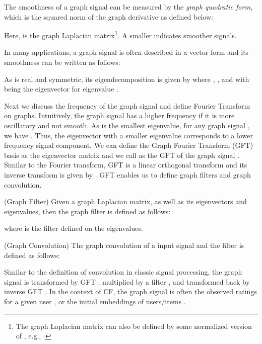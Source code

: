 \documentclass[sigconf]{acmart}
\begin{document}
The smoothness of a graph signal can be measured by the \emph{graph quadratic form}, which is the squared norm of the graph derivative as defined below:

Here,  is the graph Laplacian matrix\footnote{The graph Laplacian matrix can also be defined by some normalized version of , e.g., .}. A smaller  indicates smoother signals. 

In many applications, a graph signal is often described in a vector form  and its smoothness can be written as follows:


As  is real and symmetric, its eigendecomposition is given by  where , , and  with  being the eigenvector for eigenvalue .

Next we discuss the frequency of the graph signal and define Fourier Transform on graphs. Intuitively, the graph signal has a  higher frequency if it is more 
oscillatory and not smooth. As  is the smallest eigenvalue, for any graph signal , we have . Thus, the eigenvector with a smaller eigenvalue corresponds to a lower frequency signal component. We can define the Graph Fourier Transform (GFT) basis as the eigenvector matrix  and we call  as the GFT of the graph signal . Similar to the Fourier transform, GFT is a linear orthogonal transform and its inverse transform is given by . GFT enables us to define graph filters and graph convolution. 
\begin{definition} (Graph Filter)
Given a graph Laplacian matrix, as well as its eigenvectors and eigenvalues, then the graph filter  is defined as follows:

where  is the filter defined on the eigenvalues. 
\end{definition}

\begin{definition} (Graph Convolution) The graph convolution of a input signal  and the filter   is defined as follows:

\end{definition}
Similar to the definition of convolution in classic signal processing, the graph signal is transformed by GFT , multiplied by a filter , and transformed back by inverse GFT . In the context of CF, the graph signal is often the observed ratings for a given user \cite{chen2021scalable}, or the initial embeddings of users/items \cite{wang2019neural,he2020lightgcn}.
\end{document}
